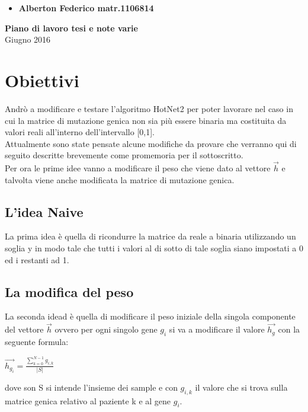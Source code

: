 \documentclass[a4paper,11pt]{article}
\begin{document}
\begin{itemize}
\item[ ]\textbf{Alberton Federico     matr.1106814}
\end{itemize}
\begin{center}

\Huge \textbf{Piano di lavoro tesi e note varie}\\ 
\normalsize{Giugno 2016}
\end{center}

\section{Obiettivi}
Andrò a modificare e testare l'algoritmo HotNet2 per poter lavorare nel caso in cui la matrice di mutazione genica non sia più essere binaria ma costituita da valori reali all'interno dell'intervallo [0,1].\\
Attualmente sono state pensate alcune modifiche da provare che verranno qui di seguito descritte brevemente come promemoria per il sottoscritto.\\
Per ora le prime idee vanno a modificare il peso che viene dato al vettore $\vec{h}$ e talvolta viene anche modificata la matrice di mutazione genica.

\subsection{L'idea Naive}
La prima idea è quella di ricondurre la matrice da reale a binaria utilizzando un soglia y in modo tale che tutti i valori al di sotto di tale soglia siano impostati a 0 ed i restanti ad 1.

\subsection{La modifica del peso}
La seconda idead è quella di modificare il peso iniziale della singola componente del vettore $\vec{h}$ ovvero per ogni singolo gene $g_i$ si va a modificare il valore $\vec{h_g}$ con la seguente formula:\bigskip\\ 
\begin{center}
$\vec{h_{g_i}} = \tfrac{\sum_{k=0}^{N-1} g_{i,k}} {|S|}$\bigskip\\
\end{center}
dove son S si intende l'insieme dei sample e con $g_{i,k}$ il valore che si trova sulla matrice genica relativo al paziente k e al gene $g_i$.
\end{document}
